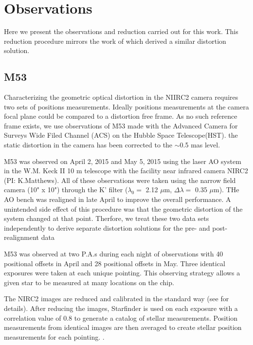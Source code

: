 \section{Observations}
Here we present the observations and reduction carried out for this work.  This reduction procedure mirrors the work of \cite{Yelda_2010} which derived a similar distortion solution.  
\subsection{M53}
Characterizing the geometric optical distortion in the NIIRC2 camera requires two sets of positions measurements.  Ideally positions measurements at the camera focal plane could be compared to a distortion free frame.  As no such reference frame exists, we use observations of M53 made with the Advanced Camera for Surveys Wide Filed Channel (ACS) on the Hubble Space Telescope(HST).  the static distortion in the camera has been corrected to the $\sim$0.5 mas level.

M53 was observed on April 2, 2015 and May 5, 2015 using the laser AO system in the W.M. Keck II 10 m telescope with the facility near infrared camera NIRC2 (PI: K.Matthews).  All of these observations were taken using the narrow field camera (10" x 10") through the K' filter ($\lambda_{0} = $ 2.12 $\mu$m, $\Delta\lambda =$ 0.35 $\mu$m).  THe AO bench was realigned  in late April to improve the overall performance.  A unintended side effect of this procedure was that the geometric distortion of the system changed at that point.  Therfore, we treat these two data sets independently to derive separate distortion solutions for the pre- and post- realignment data 

M53 was observed at two P.A.s during each night of observations with 40 positional offsets in April and 28 positional offsets in May.  Three identical exposures were taken at each unique pointing.  This observing strategy allows a given star to be measured at many locations on the chip.

The NIRC2 images are reduced and calibrated in the standard way (see \cite{Yelda_2010} for details).  After reducing the images, Starfinder \citep{Diloatti} is used on each exposure with a correlation value of 0.8 to generate a catalog of stellar measurements.  Position measurements from identical images are then averaged to create stellar position measurements for each pointing.  .



